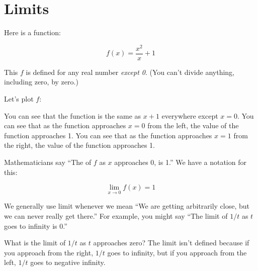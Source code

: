 \chapter{Limits}

Here is a function:

$$f(x) = \frac{x^2}{x} + 1$$

This $f$ is defined for any real number \emph{except 0}. (You can't
divide anything, including zero, by zero.)

Let's plot $f$:


You can see that the function is the same as $x + 1$ everywhere except
$x = 0$.  You can see that as the function approaches $x=0$ from the
left, the value of the function approaches 1.  You can see that as the
function approaches $x=1$ from the right, the value of the function
approaches 1.

Mathematicians say ``The  of $f$ as $x$ approaches 0, is 1.''  We have a notation for this:

$$\lim_{x \rightarrow 0} f(x) = 1$$

We generally use limit whenever we mean ``We are getting arbitrarily
close, but we can never really get there.''  For example, you might
say ``The limit of $1/t$ as $t$ goes to infinity is 0.''


What is the limit of $1/t$ as $t$ approaches zero? The limit isn't
defined because if you approach from the right, $1/t$ goes to
infinity, but if you approach from the left, $1/t$ goes to negative
infinity.
